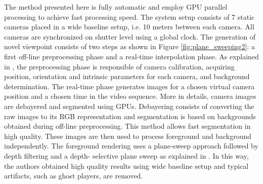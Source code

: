 The method presented here is fully automatic and employ GPU
parallel processing to achieve fast processing speed.
The system setup consists of 7 static cameras placed in a
wide baseline setup, i.e. 10 meters between each camera.
All cameras are synchronized on shutter level using a global clock.
The generation of novel viewpoint consists of two steps as shown in Figure \ref{fig:plane_sweeping2}:
a first off-line preprocessing phase and a real-time interpolation phase. 
As explained in \cite{plane_sweeping}, the preprocessing phase is responsible of camera
calibration, acquiring position, orientation and intrinsic parameters for each camera, and background determination. 
The real-time phase generates images for a chosen virtual camera 
position and a chosen time in the video sequence.
More in details, camera images are debayered and segmented using GPUs.
Debayering consists of converting the raw images to its RGB representation and segmentation is based on backgrounds
obtained during off-line preprocessing.
This method \cite{plane_sweeping} allows fast segmentation in high quality.
These images are then used to process foreground and background independently. 
The foreground rendering uses a plane-sweep
approach followed by depth filtering and a depth-
selective plane sweep as explained in \cite{plane_sweeping}.
In this way, the authors obtained high quality results using wide baseline setup and typical artifacts, such as
ghost players, are removed.
